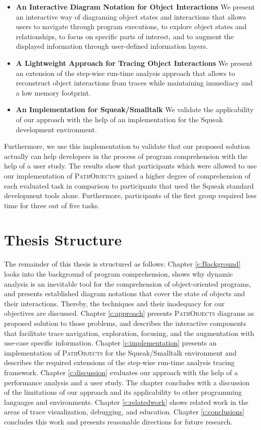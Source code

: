\begin{itemize}
\renewcommand{\labelitemiv}{$\ast$}

\item \textbf{An Interactive Diagram Notation for Object Interactions} We present an interactive way of diagraming object states and interactions that allows users to navigate through program executions, to explore object states and relationships, to focus on specific parts of interest, and to augment the displayed information through user-defined information layers.

\item \textbf{A Lightweight Approach for Tracing Object Interactions} We present an extension of the step-wise run-time analysis approach that allows to reconstruct object interactions from traces while maintaining immediacy and a low memory footprint.

\item \textbf{An Implementation for Squeak/Smalltalk} We validate the applicability of our approach with the help of an implementation for the Squeak development environment.
\end{itemize}

Furthermore, we use this implementation to validate that our proposed solution actually can help developers in the process of program comprehension with the help of a user study. 
The results show that participants which were allowed to use our implementation of \textsc{PathObjects} gained a higher degree of comprehension of each evaluated task in comparison to participants that used the Squeak standard development tools alone.
Furthermore, participants of the first group required less time for three out of five tasks.

\section{Thesis Structure}
The remainder of this thesis is structured as follows:
Chapter \ref{c:Background} looks into the background of program comprehension, shows why dynamic analysis is an inevitable tool for the comprehension of object-oriented programs, and presents established diagram notations that cover the state of objects and their interactions.
Thereby, the techniques and their inadequacy for our objectives are discussed.
Chapter \ref{c:approach} presents \textsc{PathObjects} diagrams as proposed solution to those problems, and describes the interactive components that facilitate trace navigation, exploration, focusing, and the augmentation with use-case specific information.
Chapter \ref{c:implementation} presents an implementation of \textsc{PathObjects} for the Squeak/Smalltalk environment and describes the required extensions of the step-wise run-time analysis tracing framework.
Chapter \ref{c:discussion} evaluates our approach with the help of a performance analysis and a user study. 
The chapter concludes with a discussion of the limitations of our approach and its applicability to other programming languages and environments.
Chapter \ref{c:relatedwork} shows related work in the areas of trace visualization, debugging, and education.
Chapter \ref{c:conclusions} concludes this work and presents reasonable directions for future research.